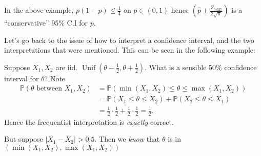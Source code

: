 \documentclass[a4paper]{scrartcl}
\begin{document}
\begin{remark}
      In the above example, $p (1-p)\leq \frac{1}{4}$ on $p \in (0,1)$ hence $(\hat{p} \pm \frac{Z_{0.025}}{2 \sqrt{n}})$ is a ``conservative'' 95\% C.I for $p$.
\end{remark}
Let's go back to the issue of how to interpret a confidence interval, and the two interpretations that were mentioned. This can be seen in the following example:
\begin{example*}
      Suppose $X_1 ,X_2 $ are iid. $\operatorname{Unif}(\theta-\frac{1}{2}, \theta+\frac{1}{2})$. What is a sensible 50\% confidence interval for $\theta$? Note 
      \begin{align*}
           \mathbb{P} (\theta \text{ between }X_1 ,X_2  )&= \mathbb{P} (\min (X_1 ,X_2 ) \leq \theta \leq \max (X_1 , X_2 ))\\
           &=\mathbb{P} (X_1 \leq \theta \leq X_2 )+\mathbb{P} (X_2 \leq \theta \leq X_1 )\\
           &=\frac{1}{2} \cdot \frac{1}{2} + \frac{1}{2} \cdot \frac{1}{2} =\frac{1}{2}.
      \end{align*}
      Hence the frequentist interpretation is \emph{exactly} correct.

      But suppose $\left|X_1 -X_2 \right|>0.5$. Then we \emph{know} that $\theta$ is in $(\min (X_1 ,X_2 ) , \max (X_1 , X_2 ))$ 
\end{example*}
\end{document}
